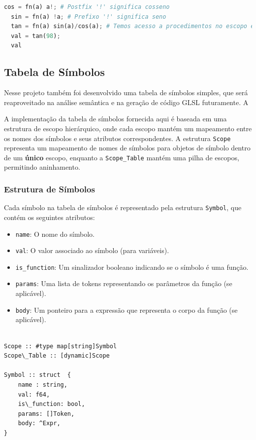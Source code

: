 \documentclass[english, 
               brazil, 
               bsc] %
               {dcomp-abntex2}
\begin{document}
\begin{algorithm}[H]
\begin{lstlisting}[language = python]
  cos = fn(a) a!; # Postfix '!' significa cosseno
  sin = fn(a) !a; # Prefixo '!' significa seno
  tan = fn(a) sin(a)/cos(a); # Temos acesso a procedimentos no escopo externo
  val = tan(98);
  val
\end{lstlisting}
\end{algorithm}

\subsection{Tabela de Símbolos}

Nesse projeto também foi desenvolvido uma tabela de símbolos simples, que será reaproveitado na análise semântica e na geração de código GLSL futuramente. A

A implementação da tabela de símbolos fornecida aqui é baseada em uma estrutura de escopo hierárquico, onde cada escopo mantém um mapeamento entre os nomes dos símbolos e seus atributos correspondentes. A estrutura \texttt{Scope} representa um mapeamento de nomes de símbolos para objetos de símbolo dentro de um \textbf{único} escopo, enquanto a \texttt{Scope\_Table} mantém uma pilha de escopos, permitindo aninhamento.

\subsubsection{Estrutura de Símbolos}

Cada símbolo na tabela de símbolos é representado pela estrutura \texttt{Symbol}, que contém os seguintes atributos:
\begin{itemize}
    \item \texttt{name}: O nome do símbolo.
    \item \texttt{val}: O valor associado ao símbolo (para variáveis).
    \item \texttt{is\_function}: Um sinalizador booleano indicando se o símbolo é uma função.
    \item \texttt{params}: Uma lista de tokens representando os parâmetros da função (se aplicável).
    \item \texttt{body}: Um ponteiro para a expressão que representa o corpo da função (se aplicável).
\end{itemize}

\begin{lstlisting}

Scope :: #type map[string]Symbol
Scope\_Table :: [dynamic]Scope

Symbol :: struct  {
    name : string,
    val: f64,
    is\_function: bool,
    params: []Token,
    body: ^Expr,
}

\end{lstlisting}
\end{document}
